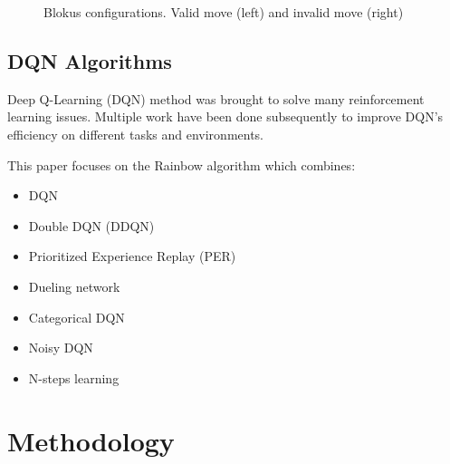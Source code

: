 \documentclass{article}
\begin{document}
\begin{figure}[h!]
\begin{minipage}{6in}
  \hspace*{.3in}
  \hspace*{.2in}
\end{minipage}
    \label{fig:moves}
\caption{Blokus configurations. Valid move (left) and invalid move (right)}
\end{figure}

\subsection{DQN Algorithms}

Deep Q-Learning (DQN) method \cite{dqn} was brought to solve many reinforcement learning issues. Multiple work have been done subsequently to improve DQN's efficiency on different tasks and environments.

This paper focuses on the Rainbow algorithm which combines:
\begin{itemize}
\item DQN
\item Double DQN (DDQN)
\item Prioritized Experience Replay (PER)
\item Dueling network
\item Categorical DQN
\item Noisy DQN
\item N-steps learning
\end{itemize}

\section{Methodology}
\end{document}
